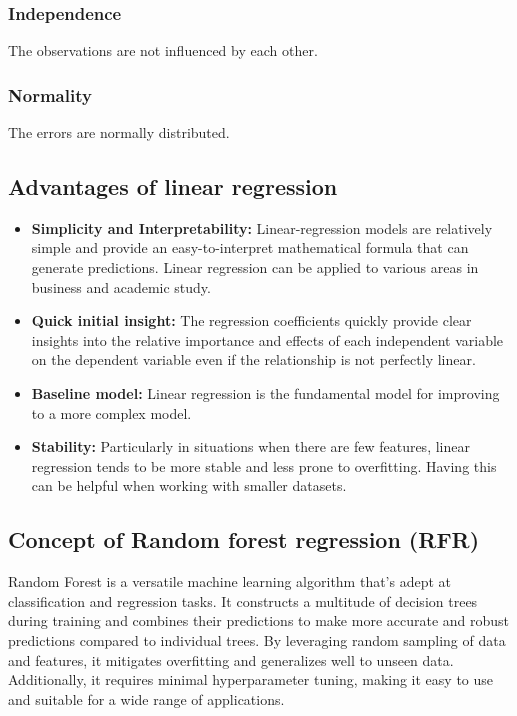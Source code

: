 \subsubsection{Independence}
\tab The observations are not influenced by each other. 

\subsubsection{Normality}
\tab The errors are normally distributed. 

\subsection{Advantages of linear regression}
    \begin{itemize}
        \item \textbf{Simplicity and Interpretability:} Linear-regression models are relatively simple and provide an easy-to-interpret mathematical formula that can generate predictions. Linear regression can be applied to various areas in business and academic study.
        \item \textbf{Quick initial insight:} The regression coefficients quickly provide clear insights into the relative importance and effects of each independent variable on the dependent variable even if the relationship is not perfectly linear.
        \item \textbf{Baseline model:} Linear regression is the fundamental model for improving to a more complex model. 
        \item \textbf{Stability:} Particularly in situations when there are few features, linear regression tends to be more stable and less prone to overfitting. Having this can be helpful when working with smaller datasets. 
    \end{itemize}

\subsection{Concept of Random forest regression (RFR)}
\tab Random Forest is a versatile machine learning algorithm that's adept at classification and regression tasks. It constructs a multitude of decision trees during training and combines their predictions to make more accurate and robust predictions compared to individual trees. By leveraging random sampling of data and features, it mitigates overfitting and generalizes well to unseen data. Additionally, it requires minimal hyperparameter tuning, making it easy to use and suitable for a wide range of applications. 

